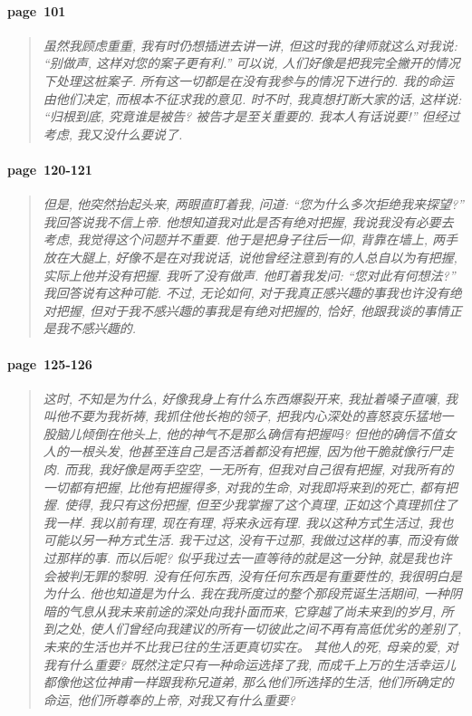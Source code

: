 \paragraph*{page~101}
\begin{quotation}
    \itshape
    虽然我顾虑重重, 我有时仍想插进去讲一讲, 但这时我的律师就这么对我说: ``别做声, 这样对您的案子更有利.'' 可以说, 人们好像是把我完全撇开的情况下处理这桩案子. 所有这一切都是在没有我参与的情况下进行的. 我的命运由他们决定, 而根本不征求我的意见. 时不时, 我真想打断大家的话, 这样说: ``归根到底, 究竟谁是被告? 被告才是至关重要的. 我本人有话说要!'' 但经过考虑, 我又没什么要说了. 
\end{quotation}

\paragraph*{page~120-121}
\begin{quotation}
    \itshape
    但是, 他突然抬起头来, 两眼直盯着我, 问道: ``您为什么多次拒绝我来探望?'' 我回答说我不信上帝. 他想知道我对此是否有绝对把握, 我说我没有必要去考虑, 我觉得这个问题并不重要. 他于是把身子往后一仰, 背靠在墙上, 两手放在大腿上, 好像不是在对我说话, 说他曾经注意到有的人总自以为有把握, 实际上他并没有把握. 我听了没有做声. 他盯着我发问: ``您对此有何想法?'' 我回答说有这种可能. 不过, 无论如何, 对于我真正感兴趣的事我也许没有绝对把握, 但对于我不感兴趣的事我是有绝对把握的, 恰好, 他跟我谈的事情正是我不感兴趣的.
\end{quotation}

\paragraph*{page~125-126}
\begin{quotation}
    \itshape
    这时, 不知是为什么, 好像我身上有什么东西爆裂开来, 我扯着嗓子直嚷, 我叫他不要为我祈祷, 我抓住他长袍的领子, 把我内心深处的喜怒哀乐猛地一股脑儿倾倒在他头上, 他的神气不是那么确信有把握吗? 但他的确信不值女人的一根头发, 他甚至连自己是否活着都没有把握, 因为他干脆就像行尸走肉. 而我, 我好像是两手空空, 一无所有, 但我对自己很有把握, 对我所有的一切都有把握, 比他有把握得多, 对我的生命, 对我即将来到的死亡, 都有把握. 使得, 我只有这份把握, 但至少我掌握了这个真理, 正如这个真理抓住了我一样. 我以前有理, 现在有理, 将来永远有理. 我以这种方式生活过, 我也可能以另一种方式生活. 我干过这, 没有干过那, 我做过这样的事, 而没有做过那样的事. 而以后呢? 似乎我过去一直等待的就是这一分钟, 就是我也许会被判无罪的黎明. 没有任何东西, 没有任何东西是有重要性的, 我很明白是为什么. 他也知道是为什么. 我在我所度过的整个那段荒诞生活期间, 一种阴暗的气息从我未来前途的深处向我扑面而来, 它穿越了尚未来到的岁月, 所到之处, 使人们曾经向我建议的所有一切彼此之间不再有高低优劣的差别了, 未来的生活也并不比我已往的生活更真切实在。 其他人的死, 母亲的爱, 对我有什么重要? 既然注定只有一种命运选择了我, 而成千上万的生活幸运儿都像他这位神甫一样跟我称兄道弟, 那么他们所选择的生活, 他们所确定的命运, 他们所尊奉的上帝, 对我又有什么重要? 
\end{quotation}

